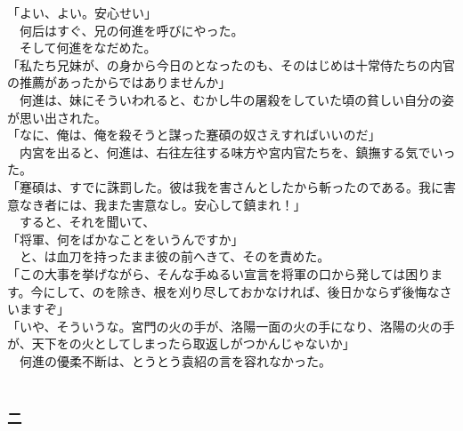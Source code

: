 \documentclass[
  paper=a5,
  fontsize=10pt,
  jafontsize=9.5pt,
  tate,                  %
  open_bracket_pos=nibu, %
]{jlreq}
\begin{document}
「よい、よい。安心せい」\\


　何后はすぐ、兄の何進を呼びにやった。\\


　そして何進をなだめた。\\


「私たち兄妹が、の身から今日のとなったのも、そのはじめは十常侍たちの内官の推薦があったからではありませんか」\\


　何進は、妹にそういわれると、むかし牛の屠殺をしていた頃の貧しい自分の姿が思い出された。\\


「なに、俺は、俺を殺そうと謀った蹇碩の奴さえすればいいのだ」\\


　内宮を出ると、何進は、右往左往する味方や宮内官たちを、鎮撫する気でいった。\\


「蹇碩は、すでに誅罰した。彼は我を害さんとしたから斬ったのである。我に害意なき者には、我また害意なし。安心して鎮まれ！」\\


　すると、それを聞いて、\\


「将軍、何をばかなことをいうんですか」\\


　と、は血刀を持ったまま彼の前へきて、そのを責めた。\\


「この大事を挙げながら、そんな手ぬるい宣言を将軍の口から発しては困ります。今にして、のを除き、根を刈り尽しておかなければ、後日かならず後悔なさいますぞ」\\


「いや、そういうな。宮門の火の手が、洛陽一面の火の手になり、洛陽の火の手が、天下をの火としてしまったら取返しがつかんじゃないか」\\


　何進の優柔不断は、とうとう袁紹の言を容れなかった。\\

\\

\subsubsection{二}
\end{document}
